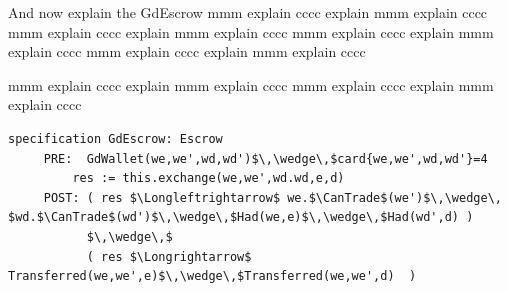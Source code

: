 \documentclass[acmsmall,review,anonymous,screen]{acmart}\settopmatter{printfolios=true,printacmref=false}
\newcommand{\CanTrade}{\mbox{\texttt{Trades}}}
\begin{document}
%      
%    
%         

\vspace{.3cm}
And now explain the GdEscrow  mmm explain cccc explain  mmm explain cccc mmm explain cccc explain  mmm explain cccc mmm explain cccc explain  mmm explain cccc mmm explain cccc explain  mmm explain cccc 

mmm explain cccc explain  mmm explain cccc mmm explain cccc explain  mmm explain cccc 


\begin{lstlisting}[mathescape=true, language=Chainmail, frame=lines] 
specification GdEscrow: Escrow
     PRE:  GdWallet(we,we',wd,wd')$\,\wedge\,$card{we,we',wd,wd'}=4
         res := this.exchange(we,we',wd.wd,e,d)
     POST: ( res $\Longleftrightarrow$ we.$\CanTrade$(we')$\,\wedge\, $wd.$\CanTrade$(wd')$\,\wedge\,$Had(we,e)$\,\wedge\,$Had(wd',d) )
           $\,\wedge\,$ 
           ( res $\Longrightarrow$ Transferred(we,we',e)$\,\wedge\,$Transferred(we,we',d)  )       
\end{lstlisting}
\end{document}
